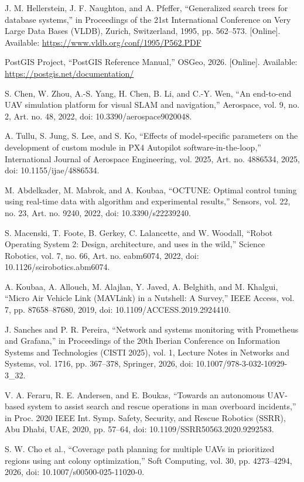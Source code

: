 \documentclass[12pt]{article}
\begin{document}
\begin{enumerate}[label={[\arabic*]},leftmargin=2em,itemsep=0.4em]
\item J. M. Hellerstein, J. F. Naughton, and A. Pfeffer, ``Generalized search trees for database systems,'' in Proceedings of the 21st International Conference on Very Large Data Bases (VLDB), Zurich, Switzerland, 1995, pp. 562--573. [Online]. Available: \url{https://www.vldb.org/conf/1995/P562.PDF}

\item PostGIS Project, ``PostGIS Reference Manual,'' OSGeo, 2026. [Online]. Available: \url{https://postgis.net/documentation/}

\item S. Chen, W. Zhou, A.-S. Yang, H. Chen, B. Li, and C.-Y. Wen, ``An end-to-end UAV simulation platform for visual SLAM and navigation,'' Aerospace, vol. 9, no. 2, Art. no. 48, 2022, doi: 10.3390/aerospace9020048.

\item A. Tullu, S. Jung, S. Lee, and S. Ko, ``Effects of model-specific parameters on the development of custom module in PX4 Autopilot software-in-the-loop,'' International Journal of Aerospace Engineering, vol. 2025, Art. no. 4886534, 2025, doi: 10.1155/ijae/4886534.

\item M. Abdelkader, M. Mabrok, and A. Koubaa, ``OCTUNE: Optimal control tuning using real-time data with algorithm and experimental results,'' Sensors, vol. 22, no. 23, Art. no. 9240, 2022, doi: 10.3390/s22239240.

\item S. Macenski, T. Foote, B. Gerkey, C. Lalancette, and W. Woodall, ``Robot Operating System 2: Design, architecture, and uses in the wild,'' Science Robotics, vol. 7, no. 66, Art. no. eabm6074, 2022, doi: 10.1126/scirobotics.abm6074.

\item A. Koubaa, A. Allouch, M. Alajlan, Y. Javed, A. Belghith, and M. Khalgui, ``Micro Air Vehicle Link (MAVLink) in a Nutshell: A Survey,'' IEEE Access, vol. 7, pp. 87658--87680, 2019, doi: 10.1109/ACCESS.2019.2924410.

\item J. Sanches and P. R. Pereira, ``Network and systems monitoring with Prometheus and Grafana,'' in Proceedings of the 20th Iberian Conference on Information Systems and Technologies (CISTI 2025), vol. 1, Lecture Notes in Networks and Systems, vol. 1716, pp. 367--378, Springer, 2026, doi: 10.1007/978-3-032-10929-3\_32.

\item V. A. Feraru, R. E. Andersen, and E. Boukas, ``Towards an autonomous UAV-based system to assist search and rescue operations in man overboard incidents,'' in Proc. 2020 IEEE Int. Symp. Safety, Security, and Rescue Robotics (SSRR), Abu Dhabi, UAE, 2020, pp. 57--64, doi: 10.1109/SSRR50563.2020.9292583.

\item S. W. Cho et al., ``Coverage path planning for multiple UAVs in prioritized regions using ant colony optimization,'' Soft Computing, vol. 30, pp. 4273--4294, 2026, doi: 10.1007/s00500-025-11020-0.
\end{enumerate}
\end{document}
